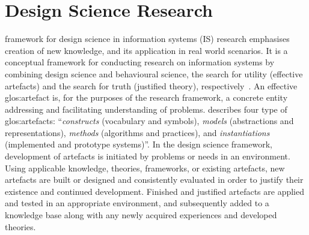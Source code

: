 \section{Design Science Research}\label{sec:DSR}
 framework for design science in information systems (IS) research emphasises creation of new knowledge, and its application in real world scenarios.
It is a conceptual framework for conducting research on information systems by combining design science and behavioural science, \ie{} the search for utility (effective artefacts) and the search for truth (justified theory), respectively~\parencite{10.2307/25148625}.
An effective \gls{glos:artefact} is, for the purposes of the research framework, a concrete entity addressing and facilitating understanding of problems.
\textcite{10.2307/25148625} describes four type of \gls{glos:artefact}s: ``\emph{constructs} (vocabulary and symbols), \emph{models} (abstractions and representations), \emph{methods} (algorithms and practices), and \emph{instantiations} (implemented and prototype systems)''.
In the design science framework, development of artefacts is initiated by problems or needs in an environment.
Using applicable knowledge, \eg{} theories, frameworks, or existing artefacts, new artefacts are built or designed and consistently evaluated in order to justify their existence and continued development.
Finished and justified artefacts are applied and tested in an appropriate environment, and subsequently added to a knowledge base along with any newly acquired experiences and developed theories.

